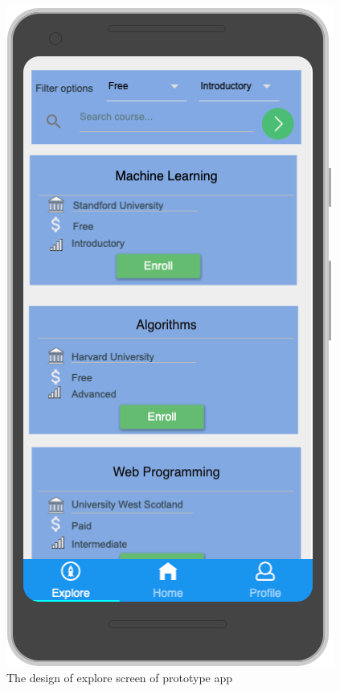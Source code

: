 \documentclass[version=last,fontsize=13pt]{scrartcl}
\begin{document}
		\begin{figure}[H]

			\centering	
			\includegraphics[scale = 0.45]{./imgs/prototype/exploreSc}
			\caption{The design of explore screen of prototype app}
			\label{fG}

		\end{figure}
\end{document}
